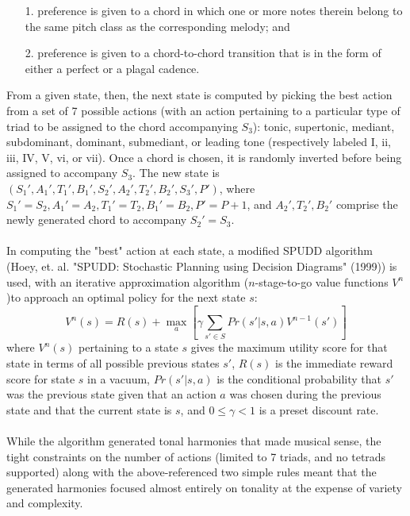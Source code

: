 \documentclass[twoside]{article}
\begin{document}
	\begin{enumerate}
		\item[1.]
		preference is given to a chord in which one or more notes therein belong to the same pitch class as the corresponding melody; and 
		\item[2.]
		preference is given to a chord-to-chord transition that is in the form of either a perfect or a plagal cadence. 
	\end{enumerate}
	From a given state, then, the next state is computed by picking the best action from a set of 7 possible actions (with an action pertaining to a particular type of triad to be assigned to the chord accompanying $S_3$): tonic, supertonic, mediant, subdominant, dominant, submediant, or leading tone (respectively labeled I, ii, iii, IV, V, vi, or vii). Once a chord is chosen, it is randomly inverted before being assigned to accompany $S_3$. The new state is $(S_1', A_1', T_1', B_1', S_2', A_2', T_2', B_2', S_3', P')$, where $S_1' = S_2,A_1'=A_2,T_1'=T_2,B_1'=B_2, P'=P+1$, and $A_2',T_2',B_2'$ comprise the newly generated chord to accompany $S_2'=S_3$. 
	\\\\
	In computing the "best" action at each state, a modified SPUDD algorithm (Hoey, et. al. "SPUDD: Stochastic Planning using Decision Diagrams" (1999)) is used, with an iterative approximation algorithm ($n$-stage-to-go value functions $V^n$)to approach an optimal policy for the next state $s$:
	$$V^n(s)=R(s)+\max_a[\gamma \sum_{s' \in S}Pr(s'|s,a)V^{n-1}(s')]$$
	where $V^n(s)$ pertaining to a state $s$ gives the maximum utility score for that state in terms of all possible previous states $s'$, $R(s)$ is the immediate reward score for state $s$ in a vacuum, $Pr(s'|s,a)$ is the conditional probability that $s'$ was the previous state given that an action $a$ was chosen during the previous state and that the current state is $s$, and $0 \leq \gamma < 1$ is a preset discount rate. 
	\\\\
	While the algorithm generated tonal harmonies that made musical sense, the tight constraints on the number of actions (limited to 7 triads, and no tetrads supported) along with the above-referenced two simple rules meant that the generated harmonies focused almost entirely on tonality at the expense of variety and complexity.
\end{document}
